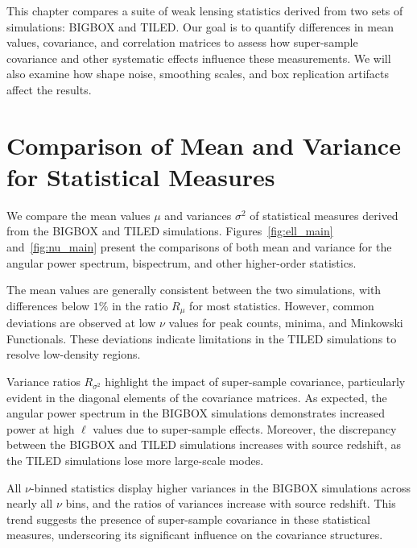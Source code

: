 This chapter compares a suite of weak lensing statistics derived from two sets of simulations: BIGBOX and TILED. Our goal is to quantify differences in mean values, covariance, and correlation matrices to assess how super-sample covariance and other systematic effects influence these measurements. We will also examine how shape noise, smoothing scales, and box replication artifacts affect the results.

\section{Comparison of Mean and Variance for Statistical Measures}
We compare the mean values $\mu$ and variances $\sigma^2$ of statistical measures derived from the BIGBOX and TILED simulations. 
Figures~\ref{fig:ell_main} and~\ref{fig:nu_main} present the comparisons of both mean and variance for the angular power spectrum, bispectrum, and other higher-order statistics.

The mean values are generally consistent between the two simulations, with differences below $1\%$ in the ratio $R_{\mu}$ for most statistics. However, common deviations are observed at low $\nu$ values for peak counts, minima, and Minkowski Functionals. These deviations indicate limitations in the TILED simulations to resolve low-density regions. 

Variance ratios $R_{\sigma^2}$ highlight the impact of super-sample covariance, particularly evident in the diagonal elements of the covariance matrices. As expected, the angular power spectrum in the BIGBOX simulations demonstrates increased power at high $\ell$ values due to super-sample effects. Moreover, the discrepancy between the BIGBOX and TILED simulations increases with source redshift, as the TILED simulations lose more large-scale modes.

All $\nu$-binned statistics display higher variances in the BIGBOX simulations across nearly all $\nu$ bins, and the ratios of variances increase with source redshift. This trend suggests the presence of super-sample covariance in these statistical measures, underscoring its significant influence on the covariance structures.

